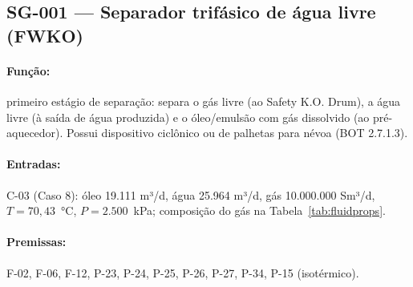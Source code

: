 \documentclass[11pt,a4paper]{article}
\numberwithin{equation}{section}
\numberwithin{table}{section}
\numberwithin{figure}{section}
\begin{document}
\subsection{SG-001 --- Separador trifásico de água livre (FWKO)}
\paragraph{Função:} primeiro estágio de separação: separa o gás livre (ao Safety K.O. Drum), a água livre (à saída de água produzida) e o óleo/emulsão com gás dissolvido (ao pré-aquecedor). Possui dispositivo ciclônico ou de palhetas para névoa (BOT 2.7.1.3).
\paragraph{Entradas:} C-03 (Caso 8): óleo 19.111 m³/d, água 25.964 m³/d, gás 10.000.000 Sm³/d, $T=70,43$~\si{\celsius}, $P=2.500$~\si{\kilo\pascal}; composição do gás na Tabela~\ref{tab:fluidprops}.
\paragraph{Premissas:} F-02, F-06, F-12, P-23, P-24, P-25, P-26, P-27, P-34, P-15 (isotérmico).
\end{document}
